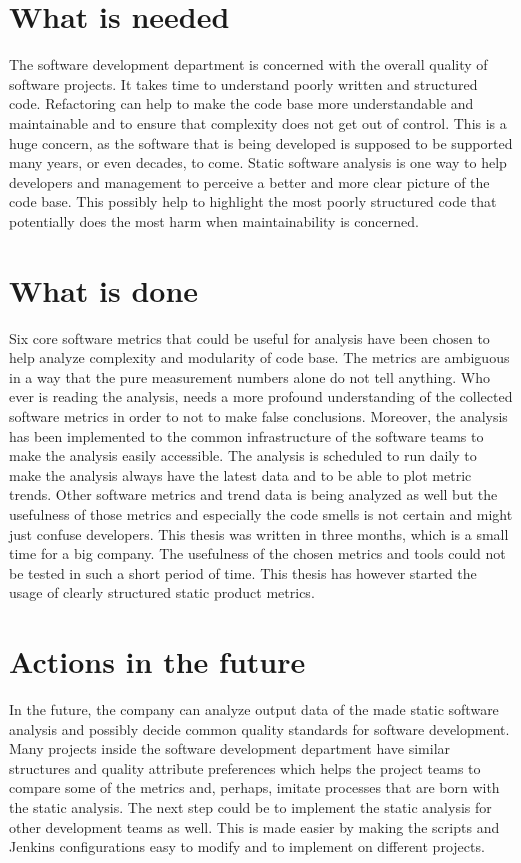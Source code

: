 \section{What is needed}

The software development department is concerned with the overall quality of software projects. It takes time to understand poorly written and structured code. Refactoring can help to make the code base more understandable and maintainable and to ensure that complexity does not get out of control. This is a huge concern, as the software that is being developed is supposed to be supported many years, or even decades, to come. Static software analysis is one way to help developers and management to perceive a better and more clear picture of the code base. This possibly help to highlight the most poorly structured code that potentially does the most harm when maintainability is concerned.

\section{What is done}

Six core software metrics that could be useful for analysis have been chosen to help analyze complexity and modularity of code base. The metrics are ambiguous in a way that the pure measurement numbers alone do not tell anything. Who ever is reading the analysis, needs a more profound understanding of the collected software metrics in order to not to make false conclusions. Moreover, the analysis has been implemented to the common infrastructure of the software teams to make the analysis easily accessible. The analysis is scheduled to run daily to make the analysis always have the latest data and to be able to plot metric trends. Other software metrics and trend data is being analyzed as well but the usefulness of those metrics and especially the code smells is not certain and might just confuse developers. This thesis was written in three months, which is a small time for a big company. The usefulness of the chosen metrics and tools could not be tested in such a short period of time. This thesis has however started the usage of clearly structured static product metrics.

\section{Actions in the future}


In the future, the company can analyze output data of the made static software analysis and possibly decide common quality standards for software development. Many projects inside the software development department have similar structures and quality attribute preferences which helps the project teams to compare some of the metrics and, perhaps, imitate processes that are born with the static analysis. The next step could be to implement the static analysis for other development teams as well. This is made easier by making the scripts and Jenkins configurations easy to modify and to implement on different projects.







